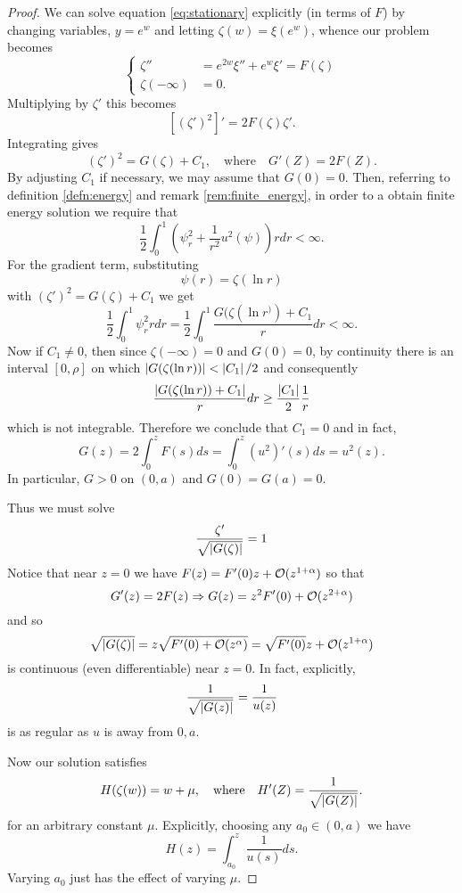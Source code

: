 \documentclass{amsart}
\begin{document}
\begin{proof}
We can solve equation \eqref{eq:stationary} explicitly (in terms of \(F\)) by changing variables, \(y = e^w\) and letting \(\zeta(w) = \xi(e^w)\), whence our problem becomes
\[
\begin{cases}
\zeta'' &= e^{2w} \xi'' + e^w \xi' = F (\zeta) \\
\zeta(-\infty) &= 0.
\end{cases}
\]
Multiplying by \(\zeta'\) this becomes
\[
[(\zeta')^2]' = 2 F (\zeta) \zeta'.
\]
Integrating gives
\[
(\zeta')^2 = G(\zeta) + C_1, \quad \text{where} \quad G'(Z) = 2 F(Z).
\]
By adjusting \(C_1\) if necessary, we may assume that \(G(0) = 0\). Then, referring to definition \ref{defn:energy} and remark \ref{rem:finite_energy}, in order to a obtain finite energy solution we require that
\[
\frac{1}{2} \int_0^1 \left(\psi_r^2 + \frac{1}{r^2} u^2(\psi)\right) r dr < \infty.
\]
For the gradient term, substituting
\[
\psi(r) = \zeta(\ln r)
\]
with \((\zeta')^2 = G(\zeta) + C_1\) we get
\[
\frac{1}{2} \int_0^1 \psi_r^2 r dr  = \frac{1}{2} \int_0^1 \frac{G(\zeta(\ln r^)) + C_1}{r} dr < \infty.
\]
Now if \(C_1 \ne 0\), then since \(\zeta(-\infty) = 0\) and \(G(0) = 0\), by continuity there is an interval \([0, \rho]\) on which \(\left|{G(\zeta(\ln r))}\right| < \left|{C_1}\right|/2\) and consequently
\[
\frac{\left|{G(\zeta(\ln r)) + C_1}\right|}{r} dr \geq \frac{\left|{C_1}\right|}{2} \frac{1}{r}
\]
which is not integrable. Therefore we conclude that \(C_1 = 0\) and in fact,
\begin{equation}
\label{eq:G}
G(z) = 2 \int_0^z F (s) ds = \int_0^z (u^2)' (s) ds = u^2 (z).
\end{equation}
In particular, \(G > 0\) on \((0,a)\) and \(G(0) = G(a) = 0\).

Thus we must solve
\begin{equation}
\label{eq:dzeta}
\frac{\zeta'}{\sqrt{\left|{G(\zeta)}\right|}} = 1
\end{equation}
Notice that near \(z = 0\) we have \(F (z) = F'(0) z + \operatorname{\mathcal{O}}(z^{1+\alpha})\) so that
\[
G'(z) = 2F(z) \Rightarrow G(z) = z^2F'(0) + \operatorname{\mathcal{O}}(z^{2 + \alpha})
\]
and so
\[
\sqrt{\left|{G(\zeta)}\right|} = z \sqrt{F'(0) + \operatorname{\mathcal{O}}(z^{\alpha})} = \sqrt{F'(0)} z + \operatorname{\mathcal{O}}(z^{1 + \alpha})
\]
is continuous (even differentiable) near \(z = 0\). In fact, explicitly,
\[
\frac{1}{\sqrt{\left|{G(z)}\right|}} = \frac{1}{u(z)}
\]
is as regular as \(u\) is away from \(0, a\).

Now our solution satisfies
\[
H (\zeta(w)) = w + \mu, \quad \text{where} \quad H'(Z) = \frac{1}{\sqrt{\left|{G(Z)}\right|}}.
\]
for an arbitrary constant \(\mu\). Explicitly, choosing any \(a_0 \in (0, a)\) we have
\begin{equation}
\label{eq:H}
H(z) = \int_{a_0}^z \frac{1}{u(s)} ds.
\end{equation}
Varying \(a_0\) just has the effect of varying \(\mu\).


\end{proof}
\end{document}
